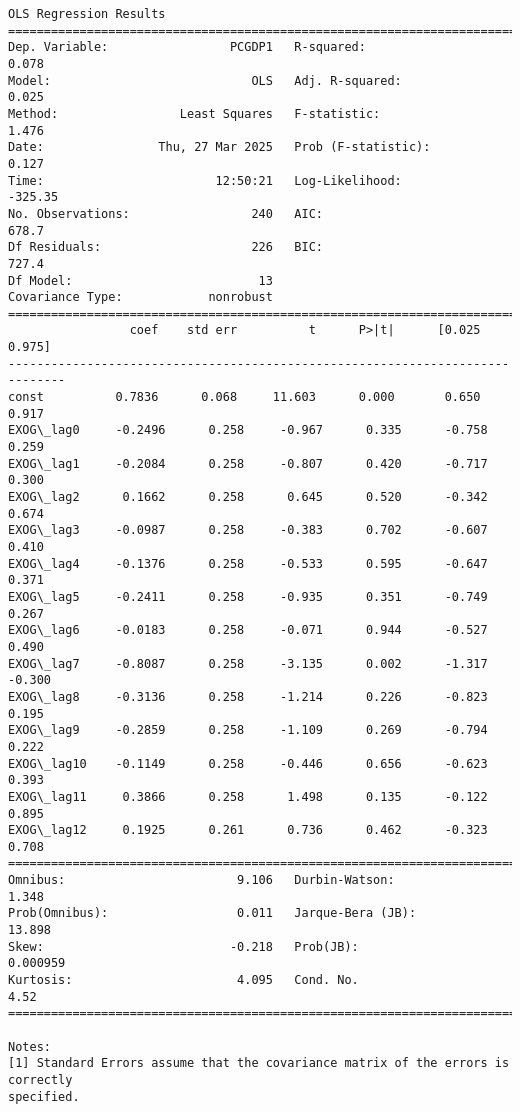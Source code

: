 \documentclass[11pt]{article}
\begin{document}
    \begin{Verbatim}[commandchars=\\\{\}]
                            OLS Regression Results
==============================================================================
Dep. Variable:                 PCGDP1   R-squared:                       0.078
Model:                            OLS   Adj. R-squared:                  0.025
Method:                 Least Squares   F-statistic:                     1.476
Date:                Thu, 27 Mar 2025   Prob (F-statistic):              0.127
Time:                        12:50:21   Log-Likelihood:                -325.35
No. Observations:                 240   AIC:                             678.7
Df Residuals:                     226   BIC:                             727.4
Df Model:                          13
Covariance Type:            nonrobust
==============================================================================
                 coef    std err          t      P>|t|      [0.025      0.975]
------------------------------------------------------------------------------
const          0.7836      0.068     11.603      0.000       0.650       0.917
EXOG\_lag0     -0.2496      0.258     -0.967      0.335      -0.758       0.259
EXOG\_lag1     -0.2084      0.258     -0.807      0.420      -0.717       0.300
EXOG\_lag2      0.1662      0.258      0.645      0.520      -0.342       0.674
EXOG\_lag3     -0.0987      0.258     -0.383      0.702      -0.607       0.410
EXOG\_lag4     -0.1376      0.258     -0.533      0.595      -0.647       0.371
EXOG\_lag5     -0.2411      0.258     -0.935      0.351      -0.749       0.267
EXOG\_lag6     -0.0183      0.258     -0.071      0.944      -0.527       0.490
EXOG\_lag7     -0.8087      0.258     -3.135      0.002      -1.317      -0.300
EXOG\_lag8     -0.3136      0.258     -1.214      0.226      -0.823       0.195
EXOG\_lag9     -0.2859      0.258     -1.109      0.269      -0.794       0.222
EXOG\_lag10    -0.1149      0.258     -0.446      0.656      -0.623       0.393
EXOG\_lag11     0.3866      0.258      1.498      0.135      -0.122       0.895
EXOG\_lag12     0.1925      0.261      0.736      0.462      -0.323       0.708
==============================================================================
Omnibus:                        9.106   Durbin-Watson:                   1.348
Prob(Omnibus):                  0.011   Jarque-Bera (JB):               13.898
Skew:                          -0.218   Prob(JB):                     0.000959
Kurtosis:                       4.095   Cond. No.                         4.52
==============================================================================

Notes:
[1] Standard Errors assume that the covariance matrix of the errors is correctly
specified.
    \end{Verbatim}
\end{document}
